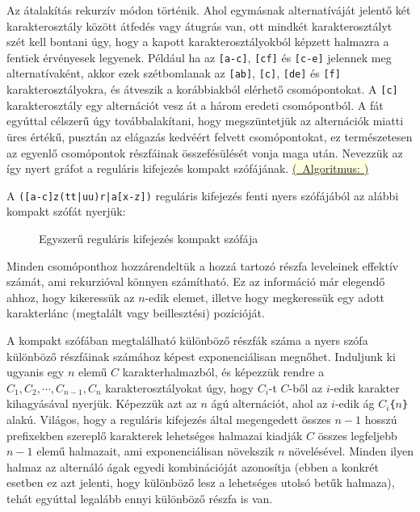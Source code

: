 \documentclass[
    parspace,
    noindent,
    nohyp,
]{elteiktdk}[2023/04/10]
\newcommand{\algorithmref}[1]{\hyperref[algorithm:#1]{\colorbox{lightyellow}{%
(\textrightarrow~Algoritmus: \nameref*{algorithm:#1})}}}
\begin{document}
Az átalakítás rekurzív módon történik.
Ahol egymásnak alternatíváját jelentő két karakterosztály között átfedés vagy átugrás van,
ott mindkét karakterosztályt szét kell bontani úgy,
hogy a kapott karakterosztályokból képzett halmazra a fentiek érvényesek legyenek.
Például ha az \texttt{[a-c]}, \texttt{[cf]} és \texttt{[c-e]} jelennek meg alternatívaként,
akkor ezek szétbomlanak az \texttt{[ab]}, \texttt{[c]}, \texttt{[de]} és \texttt{[f]}
karakterosztályokra, és átveszik a korábbiakból elérhető csomópontokat.
A \texttt{[c]} karakterosztály egy alternációt vesz át a három eredeti csomópontból.
A fát egyúttal célszerű úgy továbbalakítani, hogy megszüntetjük az alternációk miatti üres értékű,
pusztán az elágazás kedvéért felvett csomópontokat,
ez természetesen az egyenlő csomópontok részfáinak összefésülését vonja maga után.
Nevezzük az így nyert gráfot a reguláris kifejezés kompakt szófájának.
\algorithmref{regex_wordtree_create_compact}

A \texttt{([a-c]z(tt|uu)r|a[x-z])} reguláris kifejezés fenti nyers szófájából
az alábbi kompakt szófát nyerjük:

\begin{figure}[H]
\centering

\caption{Egyszerű reguláris kifejezés kompakt szófája}
\end{figure}

Minden csomóponthoz hozzárendeltük a hozzá tartozó részfa leveleinek effektív számát,
ami rekurzióval könnyen számítható.
Ez az információ már elegendő ahhoz, hogy kikeressük az $n$-edik elemet,
illetve hogy megkeressük egy adott karakterlánc (megtalált vagy beillesztési) pozícióját.

A kompakt szófában megtalálható különböző részfák száma
a nyers szófa különböző részfáinak számához képest exponenciálisan megnőhet.
Induljunk ki ugyanis egy $n$ elemű $C$ karakterhalmazból,
és képezzük rendre a $C_1, C_2, \cdots, C_{n-1}, C_n$ karakterosztályokat úgy,
hogy $C_i$-t $C$-ből az $i$-edik karakter kihagyásával nyerjük.
Képezzük azt az $n$ ágú alternációt,
ahol az $i$-edik ág $C_i$\texttt{\{}$n$\texttt{\}} alakú.
Világos, hogy a reguláris kifejezés által megengedett összes $n-1$ hosszú prefixekben
szereplő karakterek lehetséges halmazai kiadják
$C$ összes legfeljebb $n-1$ elemű halmazait,
ami exponenciálisan növekszik $n$ növelésével.
Minden ilyen halmaz az alternáló ágak egyedi kombinációját azonosítja
(ebben a konkrét esetben ez azt jelenti, hogy különböző lesz a lehetséges utolsó betűk halmaza),
tehát egyúttal legalább ennyi különböző részfa is van.
\end{document}
